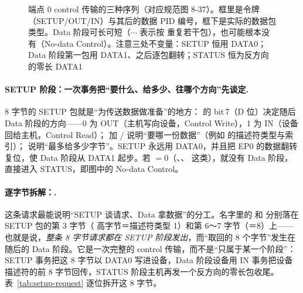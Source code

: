 \begin{figure}[htbp]
{%
  }
  \caption{端点 0 control 传输的三种序列（对应规范图 8-37）。框里是令牌（SETUP/OUT/IN）与其后的数据 PID 编号，框下是实际的数据包类型。Data 阶段可长可短（$\cdots$ 表示按  重复若干包），也可能根本没有（No-data Control）。注意三处不变量：SETUP 恒用 DATA0；Data 阶段第一包用 DATA1、之后逐包翻转；STATUS 恒为反方向的零长 DATA1}
  \label{fig:usb-control-stages}
\end{figure}

\paragraph{SETUP 阶段：一次事务把“要什么、给多少、往哪个方向”先谈定.}
8 字节的 SETUP 包就是“为传送数据做准备”的地方： 的 bit\,7（D 位）决定随后 Data 阶段的方向——0 为 OUT（主机写向设备，Control Write），1 为 IN（设备回给主机，Control Read）； 加 / 说明“要哪一份数据”（例如  的描述符类型与索引）； 说明“最多给多少字节”。SETUP 永远用 DATA0，并且把 EP0 的数据翻转复位，使 Data 阶段从 DATA1 起步。若 $=0$（、、 这类），就没有 Data 阶段，直接进入 STATUS，即图中的 No-data Control。

\paragraph{逐字节拆解：.}
这条请求最能说明“SETUP 谈请求、Data 拿数据”的分工。名字里的  和  分别落在 SETUP 包的第 3 字节（ 高字节＝描述符类型 1）和第 6～7 字节（＝8）上——也就是说，\emph{整条 8 字节请求都在 SETUP 阶段发出}，而“取回的 8 个字节”发生在随后的 Data 阶段。它是一次完整的 control 传输，而不是“只属于某一个阶段”：SETUP 事务把这 8 字节以 DATA0 写进设备，Data 阶段设备用 IN 事务把设备描述符的前 8 字节回传，STATUS 阶段主机再发一个反方向的零长包收尾。表~\ref{tab:setup-request} 逐位拆开这 8 字节。

